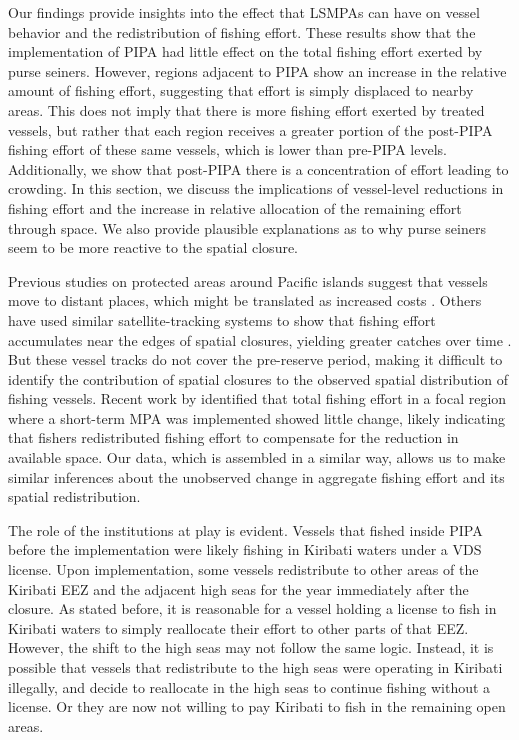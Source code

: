 \documentclass[9p,twocolumn,twoside,lineno]{pnas-new}
\begin{document}
Our findings provide insights into the effect that LSMPAs
can have on vessel behavior and the redistribution of fishing effort.
These results show that the implementation of PIPA had
little effect on the total fishing effort exerted by purse seiners. However, regions
adjacent to PIPA show an increase in the relative amount of fishing
effort, suggesting that effort is simply displaced to nearby areas.
This does not imply that there is more fishing effort exerted by treated
vessels, but rather that each region receives a greater portion of the
post-PIPA fishing effort of these same vessels, which is lower than
pre-PIPA levels. Additionally, we show that post-PIPA there is a
concentration of effort leading to crowding. In this section, we discuss
the implications of vessel-level reductions in fishing effort and the
increase in relative allocation of the remaining effort through space.
We also provide plausible explanations as to why purse seiners seem to
be more reactive to the spatial closure.

Previous studies on protected areas around Pacific islands suggest that vessels move to
distant places, which might be translated as increased costs
\citep{stevenson_2013}. Others have used similar satellite-tracking systems to
show that fishing effort accumulates near the edges of spatial closures,
yielding greater catches over time \citep{murawski_2005}. But these vessel tracks
do not cover the pre-reserve period, making it difficult to identify the
contribution of spatial closures to the observed spatial distribution of
fishing vessels. Recent work by \cite{elahi_2018} identified that total
fishing effort in a focal region where a short-term MPA was implemented
showed little change, likely indicating that fishers redistributed
fishing effort to compensate for the reduction in available space. Our
data, which is assembled in a similar way, allows us to make similar
inferences about the unobserved change in aggregate fishing effort and
its spatial redistribution.

The role of the institutions at play is evident. Vessels that fished
inside PIPA before the implementation were likely fishing in
Kiribati waters under a VDS license. Upon implementation,
some vessels redistribute to other areas of the Kiribati EEZ and the adjacent
high seas for the year immediately after the closure. As stated before,
it is reasonable for a vessel holding a license to fish in Kiribati
waters to simply reallocate their effort to other parts of that EEZ.
However, the shift to the high seas may not follow the same logic.
Instead, it is possible that vessels that redistribute to the high seas
were operating in Kiribati illegally, and decide to reallocate in the
high seas to continue fishing without a license. Or they are now not willing to pay Kiribati to fish in the remaining open areas.
\end{document}
